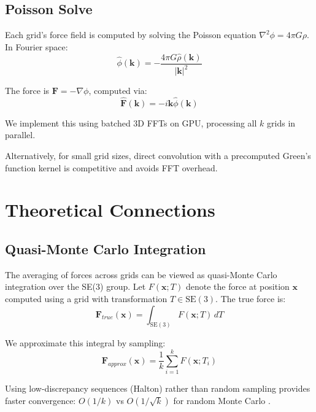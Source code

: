 \documentclass[11pt,twocolumn]{article}
\begin{document}
\subsection{Poisson Solve}

Each grid's force field is computed by solving the Poisson equation $\nabla^2 \phi = 4\pi G \rho$. In Fourier space:
\begin{equation}
\hat{\phi}(\mathbf{k}) = -\frac{4\pi G \hat{\rho}(\mathbf{k})}{|\mathbf{k}|^2}
\end{equation}

The force is $\mathbf{F} = -\nabla \phi$, computed via:
\begin{equation}
\hat{\mathbf{F}}(\mathbf{k}) = -i\mathbf{k} \hat{\phi}(\mathbf{k})
\end{equation}

We implement this using batched 3D FFTs on GPU, processing all $k$ grids in parallel.

Alternatively, for small grid sizes, direct convolution with a precomputed Green's function kernel is competitive and avoids FFT overhead.

\section{Theoretical Connections}

\subsection{Quasi-Monte Carlo Integration}

The averaging of forces across grids can be viewed as quasi-Monte Carlo integration over the SE(3) group. Let $F(\mathbf{x}; T)$ denote the force at position $\mathbf{x}$ computed using a grid with transformation $T \in \text{SE}(3)$. The true force is:
\begin{equation}
\mathbf{F}_{true}(\mathbf{x}) = \int_{\text{SE}(3)} F(\mathbf{x}; T) \, dT
\end{equation}

We approximate this integral by sampling:
\begin{equation}
\mathbf{F}_{approx}(\mathbf{x}) = \frac{1}{k} \sum_{i=1}^{k} F(\mathbf{x}; T_i)
\end{equation}

Using low-discrepancy sequences (Halton) rather than random sampling provides faster convergence: $O(1/k)$ vs $O(1/\sqrt{k})$ for random Monte Carlo \cite{niederreiter1992}.
\end{document}

